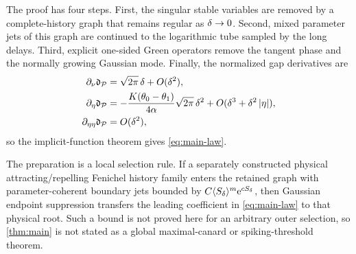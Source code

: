 The proof has four steps.  First, the singular stable variables are removed
by a complete-history graph that remains regular as \(\delta\to0\).  Second,
mixed parameter jets of this graph are continued to the logarithmic tube
sampled by the long delays.  Third, explicit one-sided Green operators remove
the tangent phase and the normally growing Gaussian mode.  Finally, the
normalized gap derivatives are
\begin{equation}
\label{eq:gap-derivative-preview}
\begin{aligned}
 \partial_\nu\mathfrak d_\mathcal P
 &=\sqrt{2\pi}\,\delta+O(\delta^2),\\
 \partial_\eta\mathfrak d_\mathcal P
 &=-\frac{K(\theta_0-\theta_1)}{4\alpha}
   \sqrt{2\pi}\,\delta^2
   +O(\delta^3+\delta^2\left\lvert \eta\right\rvert),\\
 \partial_{\eta\eta}\mathfrak d_\mathcal P&=O(\delta^2),
\end{aligned}
\end{equation}
so the implicit-function theorem gives \cref{eq:main-law}.

\begin{remark}
\label{rem:physical-outer}
The preparation is a local selection rule.  If a separately constructed
physical attracting/repelling Fenichel history family enters the retained
graph with parameter-coherent boundary jets bounded by
\(C\langle S_\delta\rangle^m\mathrm e^{cS_\delta}\), then Gaussian endpoint
suppression transfers the leading coefficient in \cref{eq:main-law} to that
physical root.  Such a bound is not proved here for an arbitrary outer
selection, so \cref{thm:main} is not stated as a global maximal-canard or
spiking-threshold theorem.
\end{remark}

